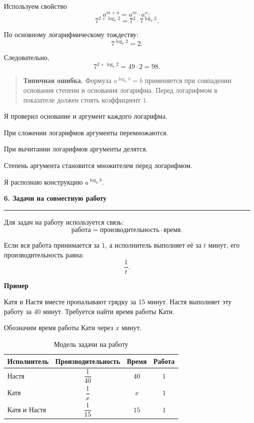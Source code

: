 \documentclass[a4paper,12pt]{article}
\newcommand{\topic}[1]{%
  \par\bigskip
  {\Large\bfseries\color{darkaccent}#1\par}
  \vspace{0.2em}
  {\color{accent}\rule{\linewidth}{0.7pt}}
  \vspace{0.55em}
}
\newcommand{\subtopic}[1]{%
  \par\medskip
  {\large\bfseries\color{darkaccent}#1\par}
  \vspace{0.2em}
}
\newcommand{\warning}[1]{%
  \begin{quote}
    \color{darkaccent}\textbf{Типичная ошибка.}\;
    \color{textgray}#1
  \end{quote}
}
\begin{document}
Используем свойство
\[
a^{m+n}=a^m\cdot a^n:
\]
\[
7^{2+\log_7 2}
=
7^2\cdot 7^{\log_7 2}.
\]

По основному логарифмическому тождеству:
\[
7^{\log_7 2}=2.
\]

Следовательно,
\[
7^{2+\log_7 2}
=
49\cdot2
=
98.
\]

\warning{Формула \(a^{\log_a b}=b\) применяется при совпадении основания степени и основания логарифма. Перед логарифмом в показателе должен стоять коэффициент \(1\).}

\begin{checklist}
  \item Я проверил основание и аргумент каждого логарифма.
  \item При сложении логарифмов аргументы перемножаются.
  \item При вычитании логарифмов аргументы делятся.
  \item Степень аргумента становится множителем перед логарифмом.
  \item Я распознаю конструкцию \(a^{\log_a b}\).
\end{checklist}

\topic{6. Задачи на совместную работу}

Для задач на работу используется связь:
\[
\text{работа}
=
\text{производительность}\cdot\text{время}.
\]

Если вся работа принимается за \(1\), а исполнитель выполняет её
за \(t\) минут, его производительность равна:
\[
\frac1t.
\]

\subtopic{Пример}

Катя и Настя вместе пропалывают грядку за \(15\) минут.
Настя выполняет эту работу за \(40\) минут. Требуется найти время
работы Кати.

Обозначим время работы Кати через \(x\) минут.

\begin{table}[htbp]
  \caption{Модель задачи на работу}
  \centering
  \begin{tabularx}{\linewidth}{@{}Xccc@{}}
    \toprule
    \textbf{Исполнитель} &
    \textbf{Производительность} &
    \textbf{Время} &
    \textbf{Работа} \\
    \midrule
    Настя & \(\dfrac1{40}\) & \(40\) & \(1\) \\
    Катя & \(\dfrac1x\) & \(x\) & \(1\) \\
    Катя и Настя & \(\dfrac1{15}\) & \(15\) & \(1\) \\
    \bottomrule
  \end{tabularx}
\end{table}
\end{document}
